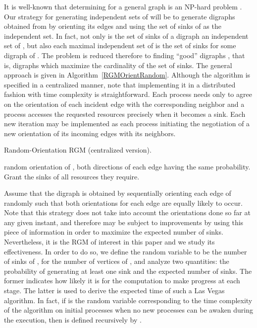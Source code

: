 \documentclass{article}
\begin{document}
It is well-known that determining  for a general graph  is an
NP-hard problem \cite{GareyJohnson}. Our strategy for generating independent
sets of  will be to generate digraphs  obtained from  by orienting its
edges and using the set of sinks of  as the independent set. In fact, not
only is the set of sinks of a digraph  an independent set of , but also
each maximal independent set of  is the set of sinks for some digraph  of
. The problem is reduced therefore to finding ``good'' digraphs , that is,
digraphs which maximize the cardinality of the set of sinks. The general
approach is given in Algorithm~\ref{RGMOrientRandom}. Although the algorithm is
specified in a centralized manner, note that implementing it in a distributed
fashion with  time complexity is straightforward. Each process needs only
to agree on the orientation of each incident edge with the corresponding
neighbor and a process accesses the requested resources precisely when it
becomes a sink. Each new iteration may be implemented as each process initiating
the negotiation of a new orientation of its incoming edges with its neighbors.

\begin{algorithm}[t]
	\caption{Random-Orientation RGM (centralized version).}
	\label{RGMOrientRandom}
	\begin{algorithmic}[1]
				\State   random orientation of , both directions of each edge having the same probability.
				\State Grant the sinks of  all resources they require.
			\EndWhile
		\EndProcedure
	\end{algorithmic}
\end{algorithm}

Assume that the digraph  is obtained by sequentially orienting each edge of
 randomly such that both orientations for each edge are equally likely to
occur. Note that this strategy does not take into account the orientations done
so far at any given instant, and therefore may be subject to improvements by
using this piece of information in order to maximize the expected number of
sinks. Nevertheless, it is the RGM of interest in this paper and we study its
effectiveness. In order to do so, we define the random variable  to be the
number of sinks of , for  the number of vertices of , and analyze two
quantities: the probability  of generating at least one
sink and the expected number  of sinks. The former indicates
how likely it is for the computation to make progress at each stage. The latter
is used to derive the expected time of such a Las Vegas algorithm. In fact, if
 is the random variable corresponding to the time complexity of the
algorithm on  initial processes when no new processes can be awaken during
the execution, then  is defined recursively by
.
\end{document}

